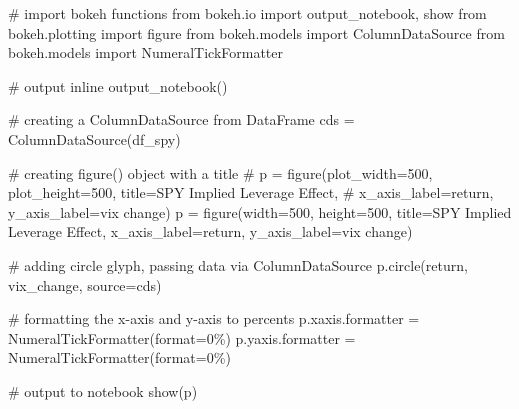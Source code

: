 \documentclass[
  letterpaper,
  DIV=11,
  numbers=noendperiod]{scrreprt}
\newenvironment{Shaded}{\begin{snugshade}}{\end{snugshade}}
\newcommand{\BuiltInTok}[1]{\textcolor[rgb]{0.00,0.23,0.31}{#1}}
\newcommand{\CommentTok}[1]{\textcolor[rgb]{0.37,0.37,0.37}{#1}}
\newcommand{\DecValTok}[1]{\textcolor[rgb]{0.68,0.00,0.00}{#1}}
\newcommand{\ImportTok}[1]{\textcolor[rgb]{0.00,0.46,0.62}{#1}}
\newcommand{\NormalTok}[1]{\textcolor[rgb]{0.00,0.23,0.31}{#1}}
\newcommand{\OperatorTok}[1]{\textcolor[rgb]{0.37,0.37,0.37}{#1}}
\newcommand{\StringTok}[1]{\textcolor[rgb]{0.13,0.47,0.30}{#1}}
\begin{document}
\begin{Shaded}
\begin{Highlighting}[]
\CommentTok{\# import bokeh functions}
\ImportTok{from}\NormalTok{ bokeh.io }\ImportTok{import}\NormalTok{ output\_notebook, show}
\ImportTok{from}\NormalTok{ bokeh.plotting }\ImportTok{import}\NormalTok{ figure}
\ImportTok{from}\NormalTok{ bokeh.models }\ImportTok{import}\NormalTok{ ColumnDataSource}
\ImportTok{from}\NormalTok{ bokeh.models }\ImportTok{import}\NormalTok{ NumeralTickFormatter}

\CommentTok{\# output inline}
\NormalTok{output\_notebook()}

\CommentTok{\# creating a ColumnDataSource from DataFrame}
\NormalTok{cds }\OperatorTok{=}\NormalTok{ ColumnDataSource(df\_spy)}

\CommentTok{\# creating figure() object with a title}
\CommentTok{\# p = figure(plot\_width=500, plot\_height=500, title=\textquotesingle{}SPY Implied Leverage Effect\textquotesingle{},}
\CommentTok{\#            x\_axis\_label=\textquotesingle{}return\textquotesingle{}, y\_axis\_label=\textquotesingle{}vix change\textquotesingle{})}
\NormalTok{p }\OperatorTok{=}\NormalTok{ figure(width}\OperatorTok{=}\DecValTok{500}\NormalTok{, height}\OperatorTok{=}\DecValTok{500}\NormalTok{, title}\OperatorTok{=}\StringTok{\textquotesingle{}SPY Implied Leverage Effect\textquotesingle{}}\NormalTok{,}
\NormalTok{           x\_axis\_label}\OperatorTok{=}\StringTok{\textquotesingle{}return\textquotesingle{}}\NormalTok{, y\_axis\_label}\OperatorTok{=}\StringTok{\textquotesingle{}vix change\textquotesingle{}}\NormalTok{)}

\CommentTok{\# adding circle glyph, passing data via ColumnDataSource}
\NormalTok{p.circle(}\StringTok{\textquotesingle{}return\textquotesingle{}}\NormalTok{, }\StringTok{\textquotesingle{}vix\_change\textquotesingle{}}\NormalTok{, source}\OperatorTok{=}\NormalTok{cds)}

\CommentTok{\# formatting the x{-}axis and y{-}axis to percents}
\NormalTok{p.xaxis.formatter }\OperatorTok{=}\NormalTok{ NumeralTickFormatter(}\BuiltInTok{format}\OperatorTok{=}\StringTok{\textquotesingle{}0\%\textquotesingle{}}\NormalTok{) }
\NormalTok{p.yaxis.formatter }\OperatorTok{=}\NormalTok{ NumeralTickFormatter(}\BuiltInTok{format}\OperatorTok{=}\StringTok{\textquotesingle{}0\%\textquotesingle{}}\NormalTok{)}

\CommentTok{\# output to notebook           }
\NormalTok{show(p)}
\end{Highlighting}
\end{Shaded}
\end{document}
